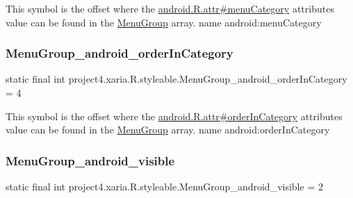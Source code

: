 This symbol is the offset where the \hyperlink{}{android.\+R.\+attr\#menu\+Category} attribute\textquotesingle{}s value can be found in the \hyperlink{classproject4_1_1xaria_1_1R_1_1styleable_ae48043cd359a2d376fa65b4af13eca9a}{Menu\+Group} array.  name android\+:menu\+Category \mbox{\label{classproject4_1_1xaria_1_1R_1_1styleable_a7352099be18dea8bbb19d98372d2b1ee}} 
\subsubsection{\texorpdfstring{Menu\+Group\+\_\+android\+\_\+order\+In\+Category}{MenuGroup\_android\_orderInCategory}}
{\footnotesize\ttfamily static final int project4.\+xaria.\+R.\+styleable.\+Menu\+Group\+\_\+android\+\_\+order\+In\+Category = 4\hspace{0.3cm}{\ttfamily [static]}}

This symbol is the offset where the \hyperlink{}{android.\+R.\+attr\#order\+In\+Category} attribute\textquotesingle{}s value can be found in the \hyperlink{classproject4_1_1xaria_1_1R_1_1styleable_ae48043cd359a2d376fa65b4af13eca9a}{Menu\+Group} array.  name android\+:order\+In\+Category \mbox{\label{classproject4_1_1xaria_1_1R_1_1styleable_a8c41524dbd054ca8362714efbaa75719}} 
\subsubsection{\texorpdfstring{Menu\+Group\+\_\+android\+\_\+visible}{MenuGroup\_android\_visible}}
{\footnotesize\ttfamily static final int project4.\+xaria.\+R.\+styleable.\+Menu\+Group\+\_\+android\+\_\+visible = 2\hspace{0.3cm}{\ttfamily [static]}}


